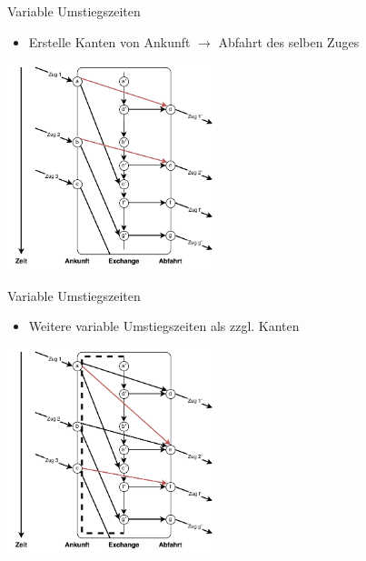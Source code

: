 \begin{frame}{Variable Umstiegszeiten}
	\begin{itemize}
		 \item Erstelle Kanten von Ankunft $\rightarrow$ Abfahrt des selben Zuges
	\end{itemize}

	\begin{center}
		\includegraphics[height=6cm]{images/time_expanded_constant_interchange_3.pdf} 
	\end{center}
\end{frame}



\begin{frame}{Variable Umstiegszeiten}
	\begin{itemize}
		\item Weitere variable Umstiegszeiten als zzgl. Kanten
	\end{itemize}

	\begin{center}
		\includegraphics[height=6cm]{images/time_expanded_variable_interchange.pdf} 
	\end{center}
\end{frame}


